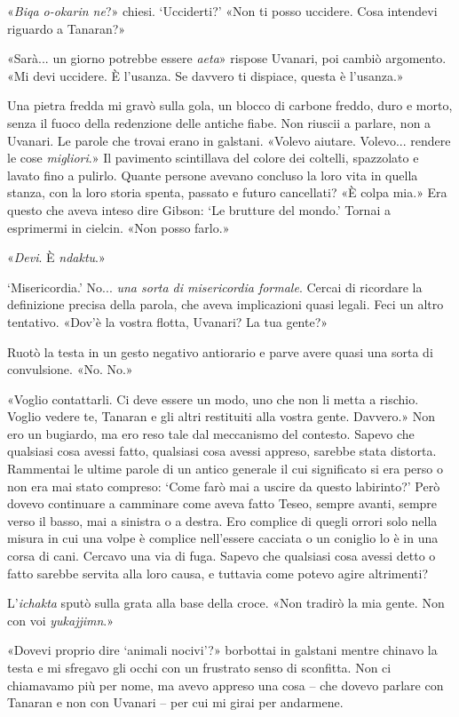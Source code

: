 «\emph{Biqa o-okarin ne}?» chiesi. `Ucciderti?' «Non ti posso uccidere.
Cosa intendevi riguardo a Tanaran?»

«Sarà... un giorno potrebbe essere \emph{aeta}» rispose Uvanari, poi
cambiò argomento. «Mi devi uccidere. È l'usanza. Se davvero ti dispiace,
questa è l'usanza.»

Una pietra fredda mi gravò sulla gola, un blocco di carbone freddo, duro
e morto, senza il fuoco della redenzione delle antiche fiabe. Non
riuscii a parlare, non a Uvanari. Le parole che trovai erano in
galstani. «Volevo aiutare. Volevo... rendere le cose \emph{migliori}.»
Il pavimento scintillava del colore dei coltelli, spazzolato e lavato
fino a pulirlo. Quante persone avevano concluso la loro vita in quella
stanza, con la loro storia spenta, passato e futuro cancellati? «È colpa
mia.» Era questo che aveva inteso dire Gibson: `Le brutture del mondo.'
Tornai a esprimermi in cielcin. «Non posso farlo.»

«\emph{Devi}. È \emph{ndaktu}.»

`Misericordia.' No... \emph{una sorta di misericordia formale}. Cercai
di ricordare la definizione precisa della parola, che aveva implicazioni
quasi legali. Feci un altro tentativo. «Dov'è la vostra flotta, Uvanari?
La tua gente?»

Ruotò la testa in un gesto negativo antiorario e parve avere quasi una
sorta di convulsione. «No. No.»

«Voglio contattarli. Ci deve essere un modo, uno che non li metta a
rischio. Voglio vedere te, Tanaran e gli altri restituiti alla vostra
gente. Davvero.» Non ero un bugiardo, ma ero reso tale dal meccanismo
del contesto. Sapevo che qualsiasi cosa avessi fatto, qualsiasi cosa
avessi appreso, sarebbe stata distorta. Rammentai le ultime parole di un
antico generale il cui significato si era perso o non era mai stato
compreso: `Come farò mai a uscire da questo labirinto?' Però dovevo
continuare a camminare come aveva fatto Teseo, sempre avanti, sempre
verso il basso, mai a sinistra o a destra. Ero complice di quegli orrori
solo nella misura in cui una volpe è complice nell'essere cacciata o un
coniglio lo è in una corsa di cani. Cercavo una via di fuga. Sapevo che
qualsiasi cosa avessi detto o fatto sarebbe servita alla loro causa, e
tuttavia come potevo agire altrimenti?

L'\emph{ichakta} sputò sulla grata alla base della croce. «Non tradirò
la mia gente. Non con voi \emph{yukajjimn}.»

«Dovevi proprio dire `animali nocivi'?» borbottai in galstani mentre
chinavo la testa e mi sfregavo gli occhi con un frustrato senso di
sconfitta. Non ci chiamavamo più per nome, ma avevo appreso una cosa --
che dovevo parlare con Tanaran e non con Uvanari -- per cui mi girai per
andarmene.

